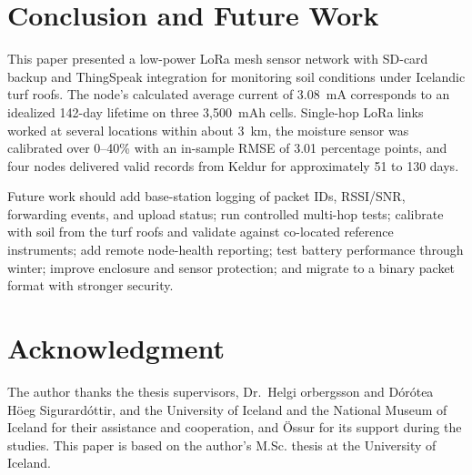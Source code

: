 \documentclass[conference]{IEEEtran}
\begin{document}
\section{Conclusion and Future Work}\label{sec:conclusion}
This paper presented a low-power LoRa mesh sensor network with SD-card backup and ThingSpeak integration for monitoring soil conditions under Icelandic turf roofs. The node's calculated average current of 3.08~mA corresponds to an idealized 142-day lifetime on three 3,500~mAh cells. Single-hop LoRa links worked at several locations within about 3~km, the moisture sensor was calibrated over 0--40\% with an in-sample RMSE of 3.01 percentage points, and four nodes delivered valid records from Keldur for approximately 51 to 130 days.

Future work should add base-station logging of packet IDs, RSSI/SNR, forwarding events, and upload status; run controlled multi-hop tests; calibrate with soil from the turf roofs and validate against co-located reference instruments; add remote node-health reporting; test battery performance through winter; improve enclosure and sensor protection; and migrate to a binary packet format with stronger security.

\section*{Acknowledgment}
The author thanks the thesis supervisors, Dr.~Helgi \TH orbergsson and D\'or\'otea H\"oeg Sigur\dh ard\'ottir, and the University of Iceland and the National Museum of Iceland for their assistance and cooperation, and \"Ossur for its support during the studies. This paper is based on the author's M.Sc. thesis at the University of Iceland.



\end{document}
